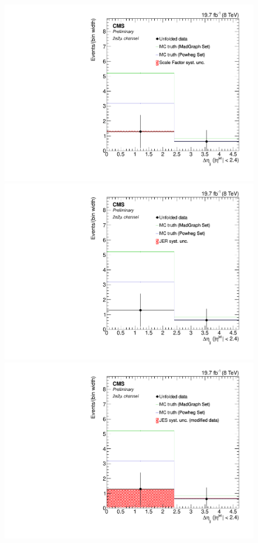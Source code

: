 \begin{figure}[hbtp]
\begin{center}
   \includegraphics[width=0.8\cmsFigWidth]{Figures/Unfolding/Systematics/ZZTo2e2m_CentralDeta_SFSq_Mad_fr}
   \includegraphics[width=0.8\cmsFigWidth]{Figures/Unfolding/Systematics/ZZTo2e2m_CentralDeta_JER_Mad_fr}
   \includegraphics[width=0.8\cmsFigWidth]{Figures/Unfolding/Systematics/ZZTo2e2m_CentralDeta_JES_ModData_Mad_fr}     

\end{center}
\end{figure}
